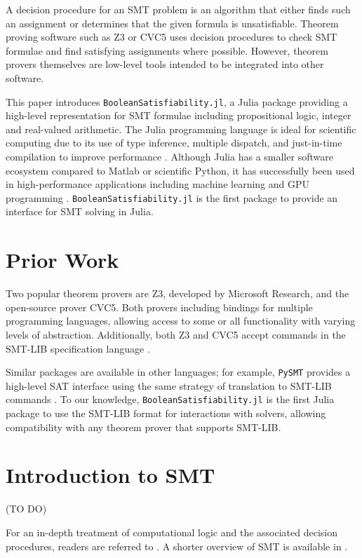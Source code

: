 \documentclass[conference]{IEEEtran}
\begin{document}
A decision procedure for an SMT problem is an algorithm that either finds such an assignment or determines that the given formula is unsatisfiable. Theorem proving software such as Z3 or CVC5 \cite{z3, cvc5} uses decision procedures to check SMT formulae and find satisfying assignments where possible. However, theorem provers themselves are low-level tools intended to be integrated into other software.

This paper introduces \verb|BooleanSatisfiability.jl|, a Julia package providing a high-level representation for SMT formulae including propositional logic, integer and real-valued arithmetic.%
The Julia programming language is ideal for scientific computing due to its use of type inference, multiple dispatch, and just-in-time compilation to improve performance \cite{bezanson2017julia, perkel2019juliaspeed}. Although Julia has a smaller software ecosystem compared to Matlab or scientific Python, it has successfully been used in high-performance applications including machine learning \cite{GAO2020juliaml} and GPU programming \cite{besard2018juliagpu}.
\verb|BooleanSatisfiability.jl| is the first package to provide an interface for SMT solving in Julia.

\section{Prior Work}
Two popular theorem provers are Z3, developed by Microsoft Research, and the open-source prover CVC5. Both provers including bindings for multiple programming languages, allowing access to some or all functionality with varying levels of abstraction. Additionally, both Z3 and CVC5 accept commands in the SMT-LIB specification language \cite{smtlib2}.

Similar packages are available in other languages; for example, \verb|PySMT| provides a high-level SAT interface using the same strategy of translation to SMT-LIB commands \cite{pysmt2015}.
To our knowledge, \verb|BooleanSatisfiability.jl| is the first Julia package to use the SMT-LIB format for interactions with solvers, allowing compatibility with any theorem prover that supports SMT-LIB.

\section{Introduction to SMT}
(TO DO)

For an in-depth treatment of computational logic and the associated decision procedures, readers are referred to \cite{bradley2007calculus, kroening2016decision}. A shorter overview of SMT is available in \cite{de2011satisfiabilityintro}.
\end{document}
